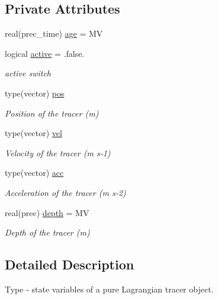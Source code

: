 \subsection*{Private Attributes}
\begin{DoxyCompactItemize}
\item 
real(prec\+\_\+time) \mbox{\hyperlink{structtracer__base__mod_1_1tracer__state__class_a626e0afcfae26bbab40a6ed5e4e6d67b}{age}} = MV
\item 
logical \mbox{\hyperlink{structtracer__base__mod_1_1tracer__state__class_ab32056ce018eb780a7af79f1598db58d}{active}} = .false.
\begin{DoxyCompactList}\small\item\em active switch \end{DoxyCompactList}\item 
type(vector) \mbox{\hyperlink{structtracer__base__mod_1_1tracer__state__class_a1b258c263cb63d6f03f08b6d969f94d7}{pos}}
\begin{DoxyCompactList}\small\item\em Position of the tracer (m) \end{DoxyCompactList}\item 
type(vector) \mbox{\hyperlink{structtracer__base__mod_1_1tracer__state__class_a3ea133d907fd662b8be1bdb540e2929d}{vel}}
\begin{DoxyCompactList}\small\item\em Velocity of the tracer (m s-\/1) \end{DoxyCompactList}\item 
type(vector) \mbox{\hyperlink{structtracer__base__mod_1_1tracer__state__class_adb9c1ee8cf97beb75d338ea0911c7fbb}{acc}}
\begin{DoxyCompactList}\small\item\em Acceleration of the tracer (m s-\/2) \end{DoxyCompactList}\item 
real(prec) \mbox{\hyperlink{structtracer__base__mod_1_1tracer__state__class_a4ccd21ef0bc2b596686276d2a44f2ee0}{depth}} = MV
\begin{DoxyCompactList}\small\item\em Depth of the tracer (m) \end{DoxyCompactList}\end{DoxyCompactItemize}


\subsection{Detailed Description}
Type -\/ state variables of a pure Lagrangian tracer object. 

